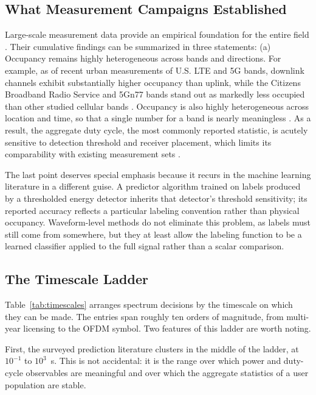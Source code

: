 \documentclass[lettersize,journal]{IEEEtran}
\begin{document}
\subsection{\textbf{What Measurement Campaigns Established}}
Large-scale measurement data provide an empirical foundation for the
entire field \cite{Chen2016}.
Their cumulative findings can be summarized in three statements:
(a) Occupancy remains highly heterogeneous across bands and directions.
For example, as of recent urban measurements of U.S. LTE and 5G
bands, downlink channels exhibit substantially higher occupancy than
uplink, while the Citizens Broadband Radio Service and 5Gn77 bands stand
out as markedly less occupied than other studied cellular bands
\cite{Raouf2023}.
Occupancy is also highly heterogeneous across location and
time, so that a single number for a band is nearly meaningless
\cite{Wellens2007, Engiz2021, Kozlowski2021}.
As a result, the aggregate duty cycle, the most commonly reported statistic,
is acutely sensitive to detection threshold and receiver placement, which limits
its comparability with existing measurement sets \cite{Wellens2010}.

The last point deserves special emphasis because it recurs in the machine
learning literature in a different guise.
A predictor algorithm trained on labels produced by a thresholded energy
detector inherits that detector's threshold sensitivity; its reported accuracy
reflects a particular labeling convention rather than physical occupancy.
Waveform-level methods do not eliminate this problem, as labels
must still come from somewhere, but they at least allow the labeling
function to be a learned classifier applied to the full signal rather
than a scalar comparison.
\subsection{\textbf{The Timescale Ladder}}
Table~\ref{tab:timescales} arranges spectrum decisions by the timescale
on which they can be made.
The entries span roughly ten orders of
magnitude, from multi-year licensing to the OFDM symbol.
Two features of this ladder are worth noting.

First, the surveyed prediction literature clusters in the middle of the
ladder, at $10^{-1}$ to $10^{3}$~s.
This is not accidental: it is the
range over which power and duty-cycle observables are meaningful and
over which the aggregate statistics of a user population are stable.
\end{document}
